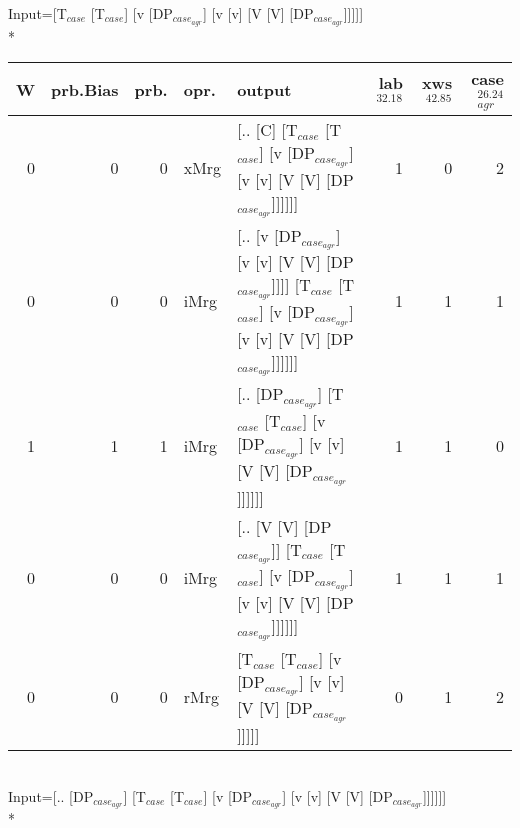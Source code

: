 \begingroup\scriptsize Input=[T$_{case}$ [T$_{case}$] [v [DP$_{case_{agr}}$] [v [v] [V [V] [DP$_{case_{agr}}$]]]]]\\*
\begin{tabularx}{\linewidth}{rrrlXrrr}
\hline
   W &   prb.Bias &   prb. & opr.   & output                                                                                                                 &   lab$^{32.18}$ &   xws$^{42.85}$ &   case$_{agr}^{26.24}$ \\
\hline
   0 &       0 &   0 & xMrg & [.. [C] [T$_{case}$ [T$_{case}$] [v [DP$_{case_{agr}}$] [v [v] [V [V] [DP$_{case_{agr}}$]]]]]]                                             &             1 &             0 &                  2 \\
   0 &       0 &   0 & iMrg & [.. [v [DP$_{case_{agr}}$] [v [v] [V [V] [DP$_{case_{agr}}$]]]] [T$_{case}$ [T$_{case}$] [v [DP$_{case_{agr}}$] [v [v] [V [V] [DP$_{case_{agr}}$]]]]]] &             1 &             1 &                  1 \\
   1 &       1 &   1 & iMrg & [.. [DP$_{case_{agr}}$] [T$_{case}$ [T$_{case}$] [v [DP$_{case_{agr}}$] [v [v] [V [V] [DP$_{case_{agr}}$]]]]]]                                   &             1 &             1 &                  0 \\
   0 &       0 &   0 & iMrg & [.. [V [V] [DP$_{case_{agr}}$]] [T$_{case}$ [T$_{case}$] [v [DP$_{case_{agr}}$] [v [v] [V [V] [DP$_{case_{agr}}$]]]]]]                           &             1 &             1 &                  1 \\
   0 &       0 &   0 & rMrg & [T$_{case}$ [T$_{case}$] [v [DP$_{case_{agr}}$] [v [v] [V [V] [DP$_{case_{agr}}$]]]]]                                                      &             0 &             1 &                  2 \\
\hline
\end{tabularx}\endgroup\\
\begingroup\scriptsize Input=[.. [DP$_{case_{agr}}$] [T$_{case}$ [T$_{case}$] [v [DP$_{case_{agr}}$] [v [v] [V [V] [DP$_{case_{agr}}$]]]]]]\\*
